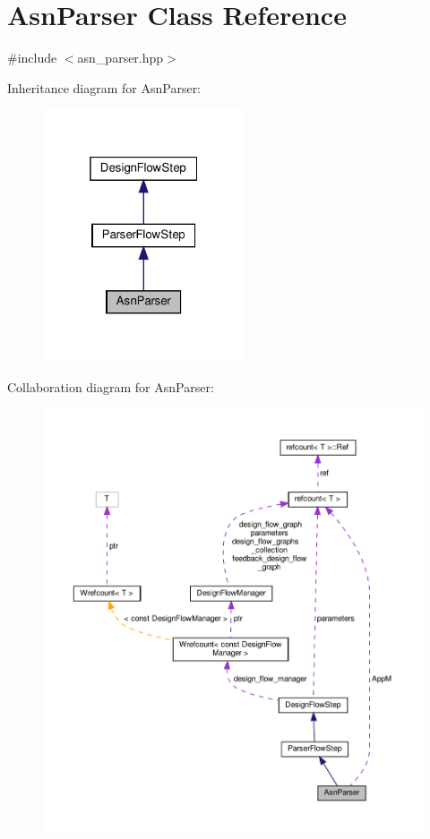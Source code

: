 \hypertarget{classAsnParser}{}\section{Asn\+Parser Class Reference}
\label{classAsnParser}


{\ttfamily \#include $<$asn\+\_\+parser.\+hpp$>$}



Inheritance diagram for Asn\+Parser\+:
\nopagebreak
\begin{figure}[H]
\begin{center}
\leavevmode
\includegraphics[width=169pt]{dd/d32/classAsnParser__inherit__graph}
\end{center}
\end{figure}


Collaboration diagram for Asn\+Parser\+:
\nopagebreak
\begin{figure}[H]
\begin{center}
\leavevmode
\includegraphics[width=350pt]{de/d7f/classAsnParser__coll__graph}
\end{center}
\end{figure}
